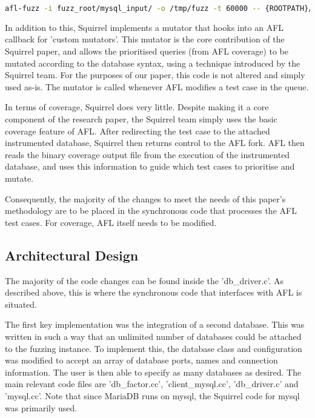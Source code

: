 \documentclass[sigconf]{acmart}
\begin{document}
\begin{lstlisting}[language=bash, caption={Squirrel Run Command}]
afl-fuzz -i fuzz_root/mysql_input/ -o /tmp/fuzz -t 60000 -- {ROOTPATH}/build/db_driver
\end{lstlisting}

In addition to this, Squirrel implements a mutator that hooks into an AFL callback for 'custom mutators'. This mutator is the core contribution of the Squirrel paper, and allows the prioritised queries (from AFL coverage) to be mutated according to the database syntax, using a technique introduced by the Squirrel team. For the purposes of our paper, this code is not altered and simply used as-is. The mutator is called whenever AFL modifies a test case in the queue.

In terms of coverage, Squirrel does very little. Despite making it a core component of the research paper, the Squirrel team simply uses the basic coverage feature of AFL. After redirecting the test case to the attached instrumented database, Squirrel then returns control to the AFL fork. AFL then reads the binary coverage output file from the execution of the instrumented database, and uses this information to guide which test cases to prioritise and mutate.

Consequently, the majority of the changes to meet the needs of this paper's methodology are to be placed in the synchronous code that processes the AFL test cases. For coverage, AFL itself needs to be modified.

\subsection{Architectural Design}
The majority of the code changes can be found inside the 'db\_driver.c'. As described above, this is where the synchronous code that interfaces with AFL is situated.

The first key implementation was the integration of a second database. This was written in such a way that an unlimited number of databases could be attached to the fuzzing instance. To implement this, the database class and configuration was modified to accept an array of database ports, names and connection information. The user is then able to specify as many databases as desired. The main relevant code files are 'db\_factor.cc', 'client\_mysql.cc', 'db\_driver.c' and 'mysql.cc'. Note that since MariaDB runs on mysql, the Squirrel code for mysql was primarily used.
\end{document}
